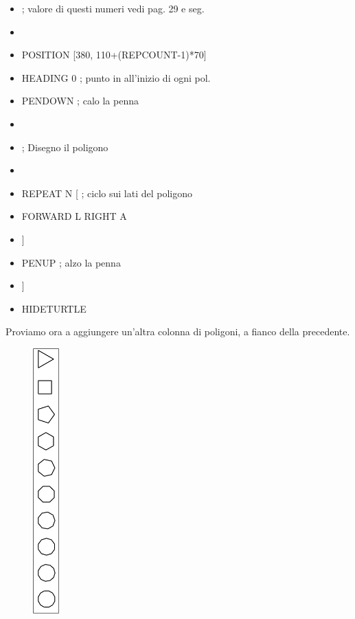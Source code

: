 \begin{scriptsize}
\begin{minipage}{0.60\textwidth}
\begin{itemize}[itemsep=-3pt,parsep=2pt]
\item[] ; valore di questi numeri vedi pag. 29 e seg. 
\item[]                                                                  
\item[] 	POSITION [380, 110+(REPCOUNT-1)*70]
\item[] 	HEADING 0	; punto in all'inizio di ogni pol.
\item[] 	PENDOWN	; calo la penna
\item[] 
\item[] ;	Disegno il poligono
\item[]                                                                  
\item[] 	REPEAT N [	; ciclo sui lati del poligono
\item[] 		FORWARD L RIGHT A
\item[] 	]
\item[] 	PENUP	; alzo la penna
\item[] ]
\item[] HIDETURTLE                                                       
\end{itemize}
Proviamo ora a aggiungere un'altra colonna di poligoni, a fianco della precedente.
\end{minipage}
\end{scriptsize}
\begin{minipage}{0.2\textwidth}
\begin{figure}[H]
   \includegraphics[width=1.0cm,trim=4 4 8 4,clip]{./images/ripetere/ripetere-6.png}
   \label{rip-6}
\end{figure}
\end{minipage} \hfill

